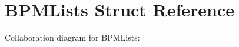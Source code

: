 \hypertarget{struct_b_p_m_lists}{}\section{B\+P\+M\+Lists Struct Reference}
\label{struct_b_p_m_lists}


Collaboration diagram for B\+P\+M\+Lists\+:
